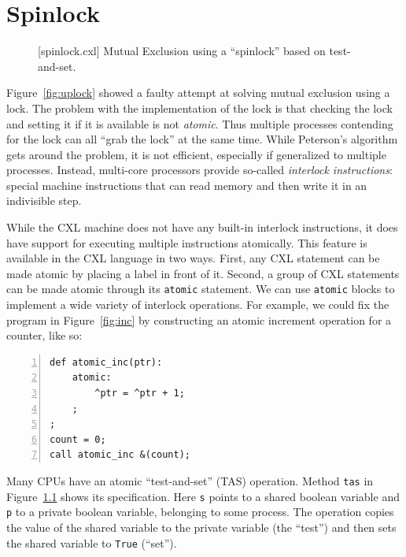 \documentclass{report}
\newenvironment{code}{
\tcolorbox
}{
\endtcolorbox
}
\begin{document}
\chapter{Spinlock}

\begin{figure}
\begin{code}
\end{code}
\caption{[spinlock.cxl] Mutual Exclusion using a ``spinlock'' based on test-and-set.}
\label{fig:tas}
\end{figure}

Figure~\ref{fig:uplock} showed a faulty attempt at solving mutual
exclusion using a lock.  The problem with the implementation of the
lock is that checking the lock and setting it if it is available is
not \emph{atomic}.  Thus multiple processes contending for the lock
can all ``grab the lock'' at the same time.  While Peterson's
algorithm gets around the problem, it is not efficient, especially
if generalized to multiple processes.  Instead, multi-core processors provide
so-called \emph{interlock instructions}: special machine instructions
that can read memory and then write it in an indivisible step.

While the CXL machine does not have any built-in interlock instructions,
it does have support for executing multiple instructions atomically.
This feature is available in the CXL language in two ways.
First, any CXL statement can be made atomic by placing a label in front
of it.  Second, a group of CXL statements can be made atomic
through its \texttt{atomic}
statement.
We can use \texttt{atomic} blocks to implement a wide variety of
interlock operations.
For example, we could fix the program in Figure~\ref{fig:inc} by
constructing an atomic increment operation for a counter, like so:
\begin{code}
\begin{Verbatim}[xleftmargin=5mm,numbers=left]
def atomic_inc(ptr):
    atomic:
        ^ptr = ^ptr + 1;
    ;
;
count = 0;
call atomic_inc &(count);
\end{Verbatim}
\end{code}

Many CPUs have an atomic ``test-and-set'' (TAS)
operation.
Method \texttt{tas} in Figure~\ref{fig:tas} shows its specification.
Here \texttt{s} points to a shared boolean variable and \texttt{p}
to a private boolean variable, belonging to some process.
The operation copies the value of the shared variable to the
private variable (the ``test'')
and then sets the shared variable to \texttt{True} (``set'').
\end{document}

